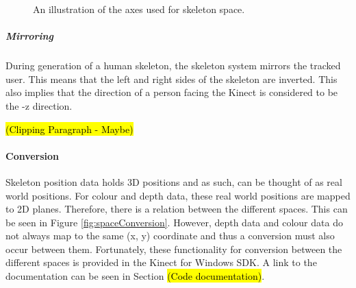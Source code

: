 \begin{figure}[ht]
	\centering
	{%
		\setlength{\fboxsep}{0pt}%
		\setlength{\fboxrule}{0.5pt}%
		}
	\caption{An illustration of the axes used for skeleton space. \cite{msdnCoSpaces2017}}
	\label{fig:skelSpaceAxes}
\end{figure}

\subparagraph{Mirroring}
During generation of a human skeleton, the skeleton system mirrors the tracked user. This means that the left and right sides of the skeleton are inverted. This also implies that the direction of a person facing the Kinect is considered to be the -z direction. \cite{msdnCoSpaces2017}

\hl{(Clipping Paragraph - Maybe)}

\paragraph{Conversion}
Skeleton position data holds 3D positions and as such, can be thought of as real world positions. For colour and depth data, these real world positions are mapped to 2D planes. Therefore, there is a relation between the different spaces. \cite{nonContact2017} This can be seen in Figure \ref{fig:spaceConversion}. However, depth data and colour data do not always map to the same (x, y) coordinate and thus a conversion must also occur between them. \cite{msdnDepthCamKinect2017} Fortunately, these functionality for conversion between the different spaces is provided in the Kinect for Windows SDK. A link to the documentation can be seen in Section \hl{(Code documentation)}.

